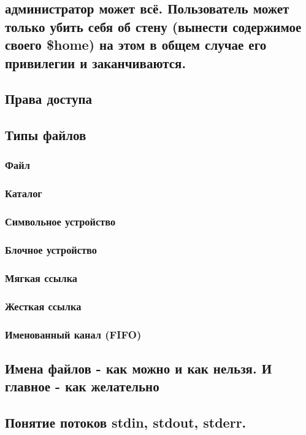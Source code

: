 \subsection{администратор может всё. Пользователь может только убить себя об стену (вынести содержимое своего \$home) на этом в общем случае его привилегии и заканчиваются.}
\subsection{Права доступа}
\subsection{Типы файлов}
\subsubsection{Файл}
\subsubsection{Каталог}
\subsubsection{Символьное устройство}
\subsubsection{Блочное устройство}
\subsubsection{Мягкая ссылка}
\subsubsection{Жесткая ссылка}
\subsubsection{Именованный канал (FIFO)}
\subsection{Имена файлов - как можно и как нельзя. И главное - как желательно}
\subsection{Понятие потоков stdin, stdout, stderr.}
